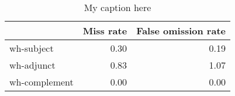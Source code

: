 \begin{table}[!ht]
\centering
\begin{tabular}{lrr}
\toprule
{} &  Miss rate &  False omission rate \\
\midrule
wh-subject    &       0.30 &                 0.19 \\
wh-adjunct    &       0.83 &                 1.07 \\
wh-complement &       0.00 &                 0.00 \\
\bottomrule
\end{tabular}
\caption{My caption here}
\label{tab:WH-ocd-combined-errors}
\end{table}